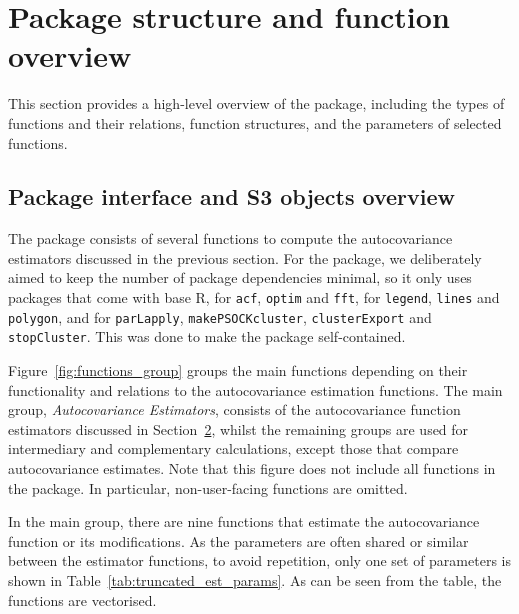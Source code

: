 \section{Package structure and function overview}\label{sec:overview}

This section provides a high-level overview of the package, including
the types of functions and their relations, function structures, and the
parameters of selected functions.

\subsection{Package interface and S3 objects
overview}\label{package-interface-and-s3-objects-overview}

The package  consists of several functions to compute
the autocovariance estimators discussed in the previous section. For the
 package, we deliberately aimed to keep the number of
package dependencies minimal, so it only uses packages that come with
base R,  for \texttt{acf}, \texttt{optim} and \texttt{fft},
 for \texttt{legend}, \texttt{lines} and \texttt{polygon},
and  for \texttt{parLapply}, \texttt{makePSOCKcluster},
\texttt{clusterExport} and \texttt{stopCluster}. This was done to make
the package self-contained.

Figure~\ref{fig:functions_group} groups the main functions depending on
their functionality and relations to the autocovariance estimation
functions. The main group, \emph{Autocovariance Estimators}, consists of
the autocovariance function estimators discussed in
Section~\hyperref[sec:nonparametric]{2}, whilst the remaining groups are
used for intermediary and complementary calculations, except those that
compare autocovariance estimates. Note that this figure does not include
all functions in the package. In particular, non-user-facing functions
are omitted.

In the main group, there are nine functions that estimate the
autocovariance function or its modifications. As the parameters are
often shared or similar between the estimator functions, to avoid
repetition, only one set of parameters is shown in
Table~\ref{tab:truncated_est_params}. As can be seen from the table, the
functions are vectorised.

